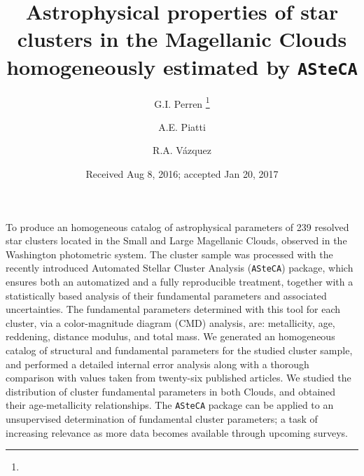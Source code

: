 \documentclass{aa}
\begin{document}
\title{Astrophysical properties of star clusters in the Magellanic Clouds
homogeneously estimated by \texttt{ASteCA}}
\subtitle{}

   \author{G.I. Perren
          \thanks{}
          \and
          A.E. Piatti
          \and
          R.A. V\'azquez
          }


   \date{Received Aug 8, 2016; accepted Jan 20, 2017}

 
\abstract
{}
{To produce an homogeneous catalog of astrophysical parameters of 239 resolved
star clusters located in the Small and Large Magellanic Clouds, observed in the
Washington photometric system.}
{The cluster sample was processed with the recently introduced Automated
Stellar Cluster Analysis (\texttt{ASteCA}) package, which ensures both an
automatized and a fully reproducible treatment, together with a statistically
based analysis of their fundamental parameters and associated uncertainties.
%
The fundamental parameters determined with this tool for each cluster, via a
color-magnitude diagram (CMD) analysis, are: metallicity, age, reddening,
distance modulus, and total mass.}
{We generated an homogeneous catalog of structural and fundamental parameters
for the studied cluster sample, and performed a detailed internal error analysis
along with a thorough comparison with values taken from twenty-six published
articles.
We studied the distribution of cluster fundamental parameters in both Clouds,
and obtained their age-metallicity relationships.}
{The \texttt{ASteCA} package can be applied to an unsupervised determination of
fundamental cluster parameters; a task of increasing relevance as more data
becomes available through upcoming surveys.}

\end{document}
